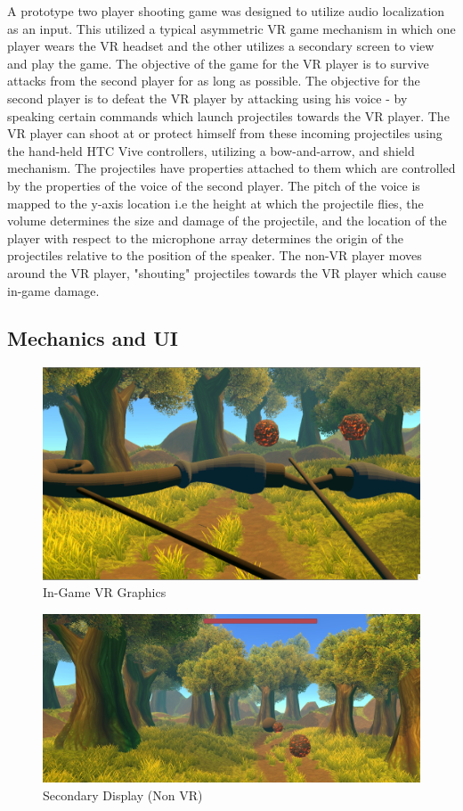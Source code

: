 \documentclass[convention]{aesconf}
\begin{document}
A prototype two player shooting game was designed to utilize audio localization as an input. This utilized a typical asymmetric VR game mechanism in which one player wears the VR headset and the other utilizes a secondary screen to view and play the game. The objective of the game for the VR player is to survive attacks from the second player for as long as possible. The objective for the second player is to defeat the VR player by attacking using his voice - by speaking certain commands which launch projectiles towards the VR player. The VR player can shoot at or protect himself from these incoming projectiles using the hand-held HTC Vive controllers, utilizing a bow-and-arrow, and shield mechanism. The projectiles have properties attached to them which are controlled by the properties of the voice of the second player. The pitch of the voice is mapped to the y-axis location i.e the height at which the projectile flies, the volume determines the size and damage of the projectile, and the location of the player with respect to the microphone array determines the origin of the projectiles relative to the position of the speaker. The non-VR player moves around the VR player, "shouting" projectiles towards the VR player which cause in-game damage.

\subsection{Mechanics and UI}

\begin{figure}[ht!]
\includegraphics[width=\linewidth]{1}
\caption{In-Game VR Graphics}
\label{auravr} %
\end{figure}


\begin{figure}[ht!]
\includegraphics[width=\linewidth]{3}
\caption{Secondary Display (Non VR)}
\label{auravr2} %
\end{figure}
\end{document}
